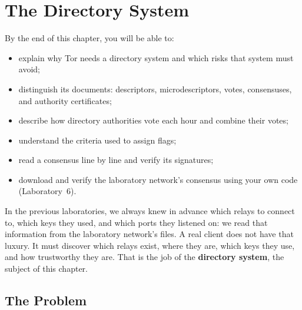 \chapter{The Directory System}\label{cap:12-directory}

\begin{obiettivi}
By the end of this chapter, you will be able to:
\begin{itemize}[nosep]
  \item explain why Tor needs a directory system and which risks that system must avoid;
  \item distinguish its documents: descriptors, microdescriptors, votes, consensuses, and authority certificates;
  \item describe how directory authorities vote each hour and combine their votes;
  \item understand the criteria used to assign flags;
  \item read a consensus line by line and verify its signatures;
  \item download and verify the laboratory network's consensus using your own code (Laboratory~6).
\end{itemize}
\end{obiettivi}

In the previous laboratories, we always knew in advance which relays to connect to, which keys they used, and which ports they listened on: we read that information from the laboratory network's files. A real client does not have that luxury. It must discover which relays exist, where they are, which keys they use, and how trustworthy they are. That is the job of the \textbf{directory system}, the subject of this chapter.

\section{The Problem}\label{sec:dir-problema}

